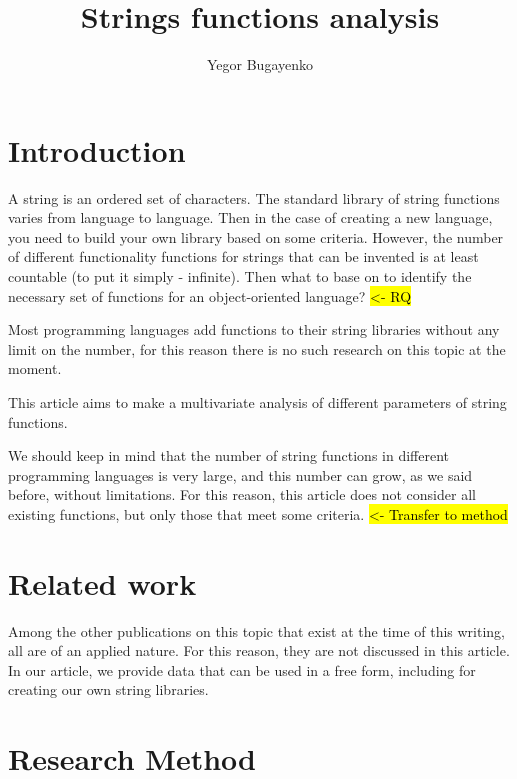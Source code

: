 \documentclass[anonymous,sigplan,review,11pt,nonacm,natbib=false]{acmart}
\title{Strings functions analysis}
\author{Yegor Bugayenko}
\affiliation{Huawei\city{Moscow}\country{Russia}}
\begin{document}
    \raggedbottom

    \begin{abstract}
    \end{abstract}

    \maketitle

    \section{Introduction}\label{sec:intro}

    A string is an ordered set of characters. The standard library of string functions varies from language to language. Then in the case of creating a new language, you need to build your own library based on some criteria. However, the number of different functionality functions for strings that can be invented is at least countable (to put it simply - infinite). Then what to base on to identify the necessary set of functions for an object-oriented language? \hl{<- RQ}

    Most programming languages add functions to their string libraries without any limit on the number, for this reason there is no such research on this topic at the moment.

    This article aims to make a multivariate analysis of different parameters of string functions.

    We should keep in mind that the number of string functions in different programming languages is very large, and this number can grow, as we said before, without limitations. For this reason, this article does not consider all existing functions, but only those that meet some criteria. \hl{<- Transfer to method}

    \section{Related work}

    Among the other publications on this topic that exist at the time of this writing, all are of an applied nature. For this reason, they are not discussed in this article. In our article, we provide data that can be used in a free form, including for creating our own string libraries.

    \section{Research Method}
\end{document}
